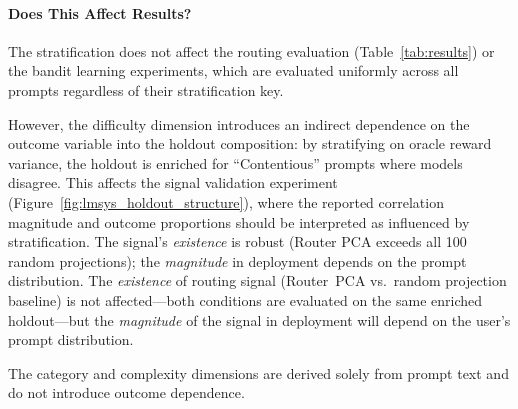 \paragraph{Does This Affect Results?}
The stratification does not affect the routing evaluation (Table~\ref{tab:results}) or the bandit learning experiments, which are evaluated uniformly across all prompts regardless of their stratification key.

However, the difficulty dimension introduces an indirect dependence on the outcome variable into the holdout composition: by stratifying on oracle reward variance, the holdout is enriched for ``Contentious'' prompts where models disagree.
This affects the signal validation experiment (Figure~\ref{fig:lmsys_holdout_structure}), where the reported correlation magnitude and outcome proportions should be interpreted as influenced by stratification. The signal's \emph{existence} is robust (Router PCA exceeds all 100 random projections); the \emph{magnitude} in deployment depends on the prompt distribution.
The \emph{existence} of routing signal (Router~PCA vs.\ random projection baseline) is not affected---both conditions are evaluated on the same enriched holdout---but the \emph{magnitude} of the signal in deployment will depend on the user's prompt distribution.

The category and complexity dimensions are derived solely from prompt text and do not introduce outcome dependence.
